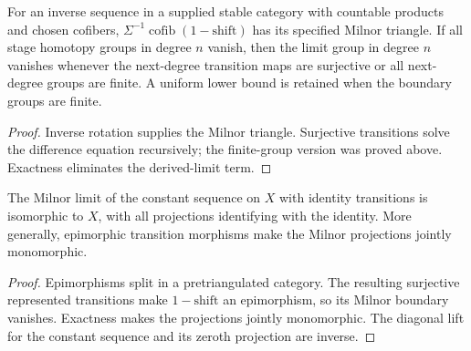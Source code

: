\begin{proposition}
  \label{prop:constructed-milnor-limit}
  \leanok
  For an inverse sequence in a supplied stable category with countable
  products and chosen cofibers, $\Sigma^{-1}\operatorname{cofib}(1-\mathrm{shift})$
  has its specified Milnor triangle. If all stage homotopy groups in
  degree $n$ vanish, then the limit group in degree $n$ vanishes whenever
  the next-degree transition maps are surjective or all next-degree
  groups are finite. A uniform lower bound is retained when the boundary
  groups are finite.
\end{proposition}
\begin{proof}
  Inverse rotation supplies the Milnor triangle. Surjective transitions
  solve the difference equation recursively; the finite-group version
  was proved above. Exactness eliminates the derived-limit term.
  \leanok
\end{proof}

\begin{proposition}
  \label{prop:constant-milnor-limit}
  \leanok
  The Milnor limit of the constant sequence on $X$ with identity
  transitions is isomorphic to $X$, with all projections identifying
  with the identity. More generally, epimorphic transition morphisms
  make the Milnor projections jointly monomorphic.
\end{proposition}
\begin{proof}
  Epimorphisms split in a pretriangulated category. The resulting
  surjective represented transitions make $1-\mathrm{shift}$ an
  epimorphism, so its Milnor boundary vanishes. Exactness makes the
  projections jointly monomorphic. The diagonal lift for the constant
  sequence and its zeroth projection are inverse.
  \leanok
\end{proof}

